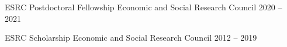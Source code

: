
\begin{cvhonors}

  \cvhonor
    {ESRC Postdoctoral Fellowship} %
    {Economic and Social Research Council} %
    {} %
    {2020 -- 2021} %

  \cvhonor
    {ESRC Scholarship} %
    {Economic and Social Research Council} %
    {} %
    {2012 -- 2019} %


\end{cvhonors}
